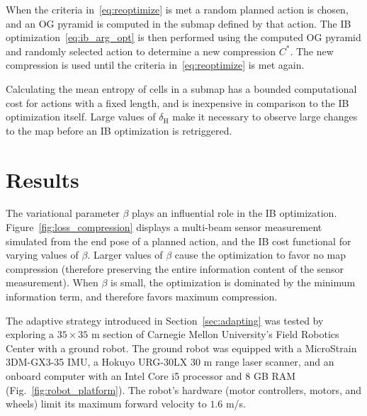 When the criteria in~\eqref{eq:reoptimize} is met a random planned action is chosen,
and an OG pyramid is computed in the submap defined by that action. The IB optimization~\eqref{eq:ib_arg_opt}
is then performed using the computed OG pyramid and randomly selected action to
determine a new compression $C^{*}$. The new compression is
used until the criteria in~\eqref{eq:reoptimize} is met again.

Calculating the mean entropy of cells in a submap has a bounded computational
cost for actions with a fixed length, and is inexpensive in comparison to the IB
optimization itself. Large values of $\delta_{\text{H}}$ make it necessary to observe
large changes to the map before an IB optimization is retriggered.

\section{Results}

The variational parameter $\beta$ plays an influential role in the IB
optimization. Figure~\ref{fig:loss_compression} displays a multi-beam
sensor measurement simulated from the end pose of a planned action, and the IB cost
functional for varying values of $\beta$. Larger values of $\beta$ cause the
optimization to favor no map compression (therefore preserving the entire
information content of the sensor measurement). When $\beta$ is small, the
optimization is dominated by the minimum information term, and therefore favors
maximum compression.

The adaptive strategy introduced in Section~\ref{sec:adapting} was tested by
exploring a $35\times35$ m section of Carnegie Mellon University's Field Robotics
Center with a ground robot. The ground robot was equipped with a MicroStrain 3DM-GX3-35 IMU,
a Hokuyo URG-30LX $30$ m range laser scanner, and an onboard computer with an Intel Core i5
processor and 8 GB RAM (Fig.~\ref{fig:robot_platform}). The robot's hardware (motor controllers,
motors, and wheels) limit its maximum forward velocity to $1.6$ m/s.

